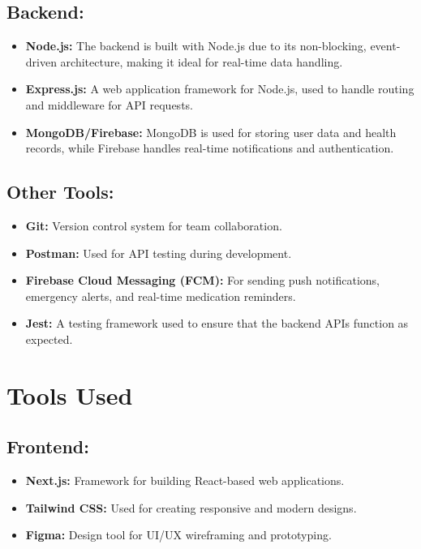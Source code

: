 \documentclass[a4paper, 12pt]{article}
\begin{document}
\subsection*{Backend:}
\begin{itemize}
    \item \textbf{Node.js:} The backend is built with Node.js due to its non-blocking, event-driven architecture, making it ideal for real-time data handling.
    \item \textbf{Express.js:} A web application framework for Node.js, used to handle routing and middleware for API requests.
    \item \textbf{MongoDB/Firebase:} MongoDB is used for storing user data and health records, while Firebase handles real-time notifications and authentication.
\end{itemize}

\subsection*{Other Tools:}
\begin{itemize}
    \item \textbf{Git:} Version control system for team collaboration.
    \item \textbf{Postman:} Used for API testing during development.
    \item \textbf{Firebase Cloud Messaging (FCM):} For sending push notifications, emergency alerts, and real-time medication reminders.
    \item \textbf{Jest:} A testing framework used to ensure that the backend APIs function as expected.
\end{itemize}

\section{\textbf{\LARGE Tools Used}}

\subsection*{Frontend:}
\begin{itemize}
    \item \textbf{Next.js:} Framework for building React-based web applications.
    \item \textbf{Tailwind CSS:} Used for creating responsive and modern designs.
    \item \textbf{Figma:} Design tool for UI/UX wireframing and prototyping.
\end{itemize}
\end{document}
